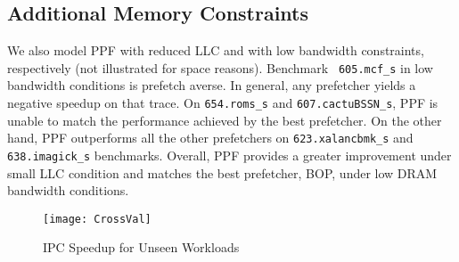 
\subsection{Additional Memory Constraints}
\label{Results-AdditionalMem}


We also model PPF with reduced LLC and with low bandwidth constraints,
respectively (not illustrated for space reasons).  Benchmark {\tt
  605.mcf\_s} in low bandwidth conditions is prefetch averse. In
general, any prefetcher yields a negative speedup on that trace. On
{\tt 654.roms\_s} and {\tt 607.cactuBSSN\_s}, PPF is unable to match
the performance achieved by the best prefetcher. On the other hand,
PPF outperforms all the other prefetchers on {\tt 623.xalancbmk\_s}
and {\tt 638.imagick\_s} benchmarks.  Overall, PPF provides a greater
improvement under small LLC condition and matches the best prefetcher,
BOP, under low DRAM bandwidth conditions.


\begin{figure}[ht]
\begin{adjustwidth}{-0.4cm}{}
\texttt{[image: CrossVal]}
\caption{IPC Speedup for Unseen Workloads}
\label{Fig:CrossVal}
\end{adjustwidth}
\end{figure}

